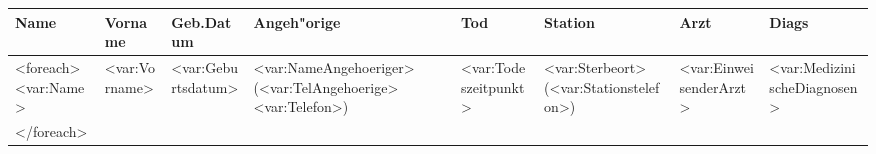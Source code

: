 \documentclass[a4]{scrreprt}
\begin{document}
\begin{landscape}
\scriptsize

\begin{longtable}{lllp{2cm}p{2cm}p{2cm}p{1cm}p{7.5cm}}
Name & Vorname & Geb.Datum & Angeh"orige & Tod & Station & Arzt & Diags\\ \hline
<foreach>
<var:Name> & <var:Vorname> & <var:Geburtsdatum> & <var:NameAngehoeriger> (<var:TelAngehoerige>  <var:Telefon>) & <var:Todeszeitpunkt> & <var:Sterbeort> (<var:Stationstelefon>) & <var:EinweisenderArzt> &  <var:MedizinischeDiagnosen>
\\ \hline
</foreach>
\end{longtable}
\end{landscape}
\end{document}

